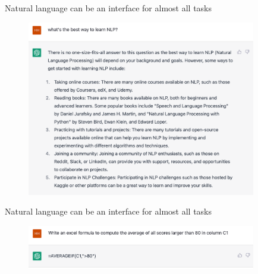 \documentclass[usenames,dvipsnames,notes,11pt,aspectratio=169]{beamer}
\begin{document}
\begin{frame}
    {Natural language can be an interface for almost all tasks}
    \begin{figure}
        \includegraphics[width=10cm]{figures/chatgpt-1}
    \end{figure}
\end{frame}

\begin{frame}
    {Natural language can be an interface for almost all tasks}
    \begin{figure}
        \includegraphics[width=10cm]{figures/chatgpt-2}
    \end{figure}
\end{frame}
\end{document}
